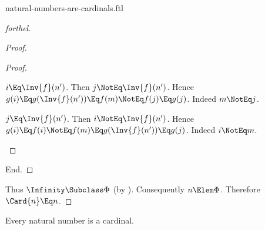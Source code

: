 \documentclass{stex}
\begin{document}
\begin{smodule}{natural-numbers-are-cardinals.ftl}
\begin{proof}[forthel]
\begin{proof}
\begin{proof}
        \begin{case}{$i \Eq \Inv{f}(n')$.}
          Then $j \NotEq \Inv{f}(n')$.
          Hence $g(i)
            \Eq g(\Inv{f}(n'))
            \Eq f(m)
            \NotEq f(j)
            \Eq g(j)$.
          Indeed $m \NotEq j$.
        \end{case}

        \begin{case}{$j \Eq \Inv{f}(n')$.}
          Then $i \NotEq \Inv{f}(n')$.
          Hence $g(i)
            \Eq f(i)
            \NotEq f(m)
            \Eq g(\Inv{f}(n'))
            \Eq g(j)$.
          Indeed $i \NotEq m$.
        \end{case}
      \end{proof}
    End.
  \end{proof}

  Thus $\Infinity \Subclass \Phi$ (by ).
  Consequently $n \Elem \Phi$.
  Therefore $\Card{n} \Eq n$.
\end{proof}

\begin{proposition*}[forthel]
  Every natural number is a cardinal.
\end{proposition*}

\end{smodule}
\end{document}
